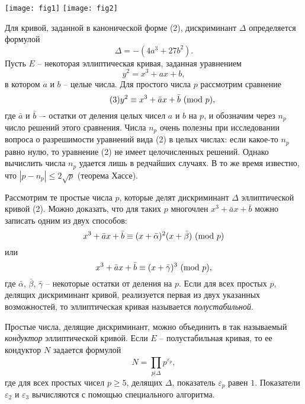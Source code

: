 \begin{multicols}{3}
\begin{Figure}
 \centering
 \texttt{[image: fig1]}
 \hspace{\columnwidth}
 \texttt{[image: fig2]}
\end{Figure}
\noindent
Для кривой, заданной в канонической форме (2), дискриминант $\Delta$ определяется формулой
\begin{equation*}
    \Delta = -(4a^3 + 27b^2).
\end{equation*}
Пусть $E$  -- некоторая эллиптическая кривая, заданная уравнением
\begin{equation*}
    y^2 = x^3 + ax + b,
\end{equation*}
в котором $a$ и $b$ -- целые числа. Для простого числа $p$ рассмотрим сравнение
\begin{equation}
    \tag{3}
    \label{eq:comp}
    y^2 \equiv x^3 + \bar{a}x + \bar{b}\ (\mathrm{mod}\ p),
\end{equation}
где $\bar{a}$ и $\bar{b}$ –- остатки от деления целых чисел $a$ и $b$ на $p$, и обозначим через $n_p$ число решений этого сравнения. Числа $n_p$ очень полезны при исследовании вопроса о разрешимости уравнений вида (2) в целых числах: если какое-то $n_p$ равно нулю, то уравнение (2) не имеет целочисленных решений. Однако вычислить числа $n_p$ удается лишь в редчайших случаях.
В то же время известно, что $|p - n_p| \leq 2 \sqrt{p}$ (теорема Хассе).

Рассмотрим те простые числа  $p$, которые делят дискриминант $\Delta $ эллиптической кривой (2). Можно доказать, что для таких $p$ многочлен $x^3 +\bar{a}x + \bar{b}$ можно записать одним из двух способов:
\begin{equation*}
    x^3 + \bar{a}x + \bar{b} \equiv (x + \bar{\alpha})^2(x + \bar{\beta})\ (\mathrm{mod}\ p)
\end{equation*}
или
\begin{equation*}
    x^3 + \bar{a}x + \bar{b} \equiv (x + \bar{\gamma})^3\ (\mathrm{mod}\ p),
\end{equation*}
где $\bar{\alpha}$, $\bar{\beta}$, $\bar{\gamma}$ -- некоторые остатки от деления на $p$. Если для всех простых $p$, делящих дискриминант кривой, реализуется первая из двух указанных возможностей, то эллиптическая кривая называется \emph{полустабильной}.

Простые числа, делящие дискриминант, можно объединить в так называемый \emph{кондуктор} эллиптической кривой. Если $E$ -- полустабильная кривая, то ее кондуктор $N$ задается формулой
\begin{equation}
    \tag{4}
    N = \prod_{p|\Delta}^{} p^{\varepsilon_p},
\end{equation}
где для всех простых чисел $p \geq 5$, делящих $\Delta$, показатель $\varepsilon_p$ равен $1$. Показатели $\varepsilon_2$ и $\varepsilon_3$ вычисляются с помощью специального алгоритма.

\end{multicols}
